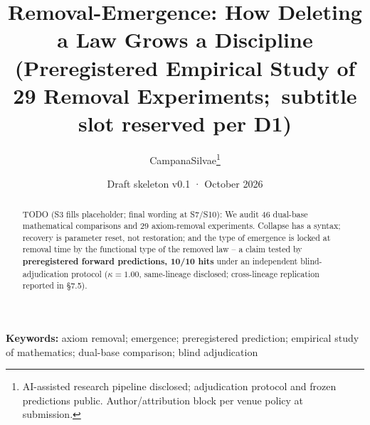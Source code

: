 \documentclass[11pt]{article}
\title{\textbf{Removal-Emergence: How Deleting a Law Grows a Discipline}\\
\large \normalfont (Preregistered Empirical Study of 29 Removal Experiments;\ subtitle slot reserved per D1)}
\author{CampanaSilvae\footnote{AI-assisted research pipeline disclosed; adjudication protocol and frozen predictions public. Author/attribution block per venue policy at submission.}}
\date{Draft skeleton v0.1 · October 2026}
\begin{document}
\maketitle

\begin{abstract}
TODO (S3 fills placeholder; final wording at S7/S10):
We audit 46 dual-base mathematical comparisons and 29 axiom-removal
experiments. Collapse has a syntax; recovery is parameter reset, not
restoration; and the type of emergence is locked at removal time by the
functional type of the removed law -- a claim tested by
\textbf{preregistered forward predictions, 10/10 hits} under an
independent blind-adjudication protocol ($\kappa=1.00$, same-lineage
disclosed; cross-lineage replication reported in §7.5).
\end{abstract}

\noindent\textbf{Keywords:} axiom removal; emergence; preregistered
prediction; empirical study of mathematics; dual-base comparison; blind
adjudication

\tableofcontents

\end{document}
